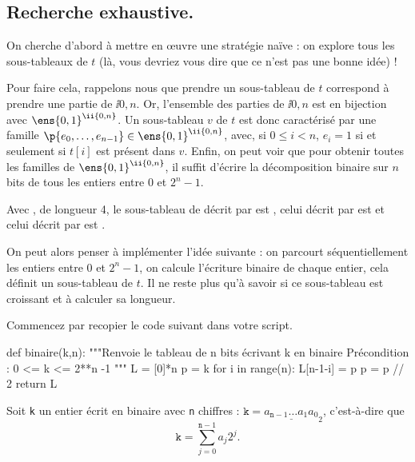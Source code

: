 \subsection{Recherche exhaustive.}

On cherche d'abord à mettre en {\oe}uvre une stratégie naïve : on explore tous les sous-tableaux de $t$ (là, vous devriez vous dire que ce n'est pas une bonne idée) ! 

Pour faire cela, rappelons nous que prendre un sous-tableau de $t$ correspond à prendre une partie de $\ii{0,n}$. Or, l'ensemble des parties de $\ii{0,n}$ est en bijection avec $\ens{0,1}^{\ii{0,n}}$.
Un sous-tableau $v$ de $t$ est donc caractérisé par une famille $\p{e_0,\dots,e_{n-1}} \in \ens{0,1}^{\ii{0,n}}$, avec, si $0\leq i < n$, $e_i = 1$ si et seulement si $t[i]$ est présent dans $v$.
Enfin, on peut voir que pour obtenir toutes les familles de $ \ens{0,1}^{\ii{0,n}}$, il suffit d'écrire la décomposition binaire sur $n$ bits de tous les entiers entre $0$ et $2^n-1$. 

\begin{ex}
  Avec , de longueur 4, le sous-tableau de  décrit par \pyv{[0,0,0,0]} est \pyv{[]}, celui décrit par \pyv{[1,0,0,1]} est \pyv{[1,2]} et celui décrit par \pyv{[0,1,1,1]} est \pyv{[5,3,2]}.
\end{ex}


On peut alors penser à implémenter l'idée suivante : on parcourt séquentiellement les entiers entre $0$ et $2^n-1$, on calcule l'écriture binaire de chaque entier, cela définit un sous-tableau de $t$.
Il ne reste plus qu'à savoir si ce sous-tableau est croissant et à calculer sa longueur. 

\medskip{}

Commencez par recopier le code suivant dans votre script. 

\begin{pyverbatim}
def binaire(k,n):
    """Renvoie le tableau de n bits écrivant k en binaire
    Précondition : 0 <= k <= 2**n -1 """
    L = [0]*n
    p = k
    for i in range(n):
        L[n-1-i] = p %
        p = p // 2
    return L
\end{pyverbatim}

\medskip{}

Soit \texttt{k} un entier écrit en binaire avec \texttt{n} chiffres : $\texttt{k} = \underline{a_{\texttt{n}-1}\ldots a_{1}a_{0}}_{2}$, c'est-à-dire que 
\begin{equation*}
  \texttt{k} = \sum_{j=0}^{\texttt{n}-1} a_j 2^j.
\end{equation*}

